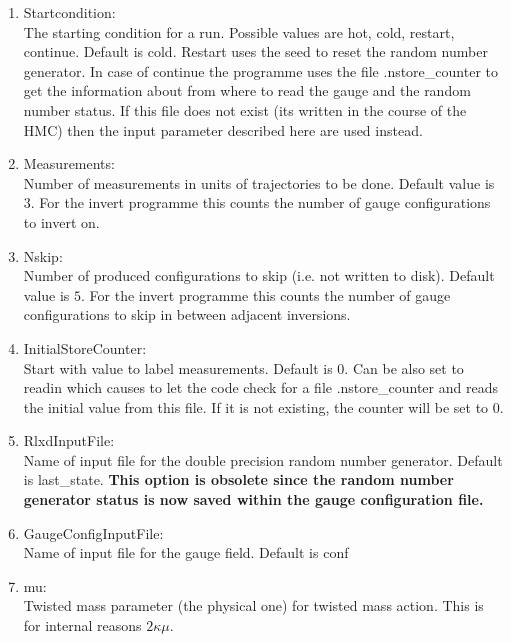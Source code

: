 \begin{enumerate}
\item {\ttfamily Startcondition}:\\
  The starting condition for a run. Possible values are {\ttfamily
    hot, cold, restart, continue}. Default is {\ttfamily
    cold}. Restart uses the seed to reset the random number
  generator. In case of {\ttfamily continue} the programme uses the
  file {\ttfamily .nstore\_counter} to get the information about from
  where to read the gauge and the random number status. If this file
  does not exist (its written in the course of the HMC) then the input
  parameter described here are used instead.

\item {\ttfamily Measurements}:\\
  Number of measurements in units of trajectories to be done. Default
  value is $3$. For the {\ttfamily invert} programme this counts the
  number of gauge configurations to invert on.

\item {\ttfamily Nskip}:\\
  Number of produced configurations to skip (i.e. not written to
  disk). Default value is $5$. For the {\ttfamily invert} programme
  this counts the number of gauge configurations to skip in between
  adjacent inversions.

\item {\ttfamily InitialStoreCounter}:\\
  Start with value to label measurements. Default is $0$. Can be also
  set to {\ttfamily readin} which causes to let the code check for a
  file {\ttfamily .nstore\_counter} and reads the initial value from
  this file. If it is not existing, the counter will be set to $0$.

\item {\ttfamily RlxdInputFile}:\\
  Name of input file for the double precision random number
  generator. Default is {\ttfamily last\_state}. {\bf This option is
  obsolete since the random number generator status is now saved
  within the gauge configuration file.}

\item {\ttfamily GaugeConfigInputFile}:\\
  Name of input file for the gauge field. Default is {\ttfamily conf}

\item {\ttfamily mu}:\\
  Twisted mass parameter (the physical one) for twisted mass
  action. This is for internal reasons $2\kappa\mu$.


\end{enumerate}
